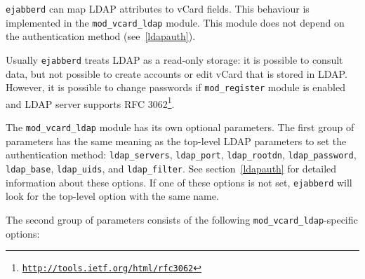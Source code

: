\documentclass[a4paper,10pt]{book}
\newcommand{\option}[1]{\texttt{#1}}
\newcommand{\ejabberd}{\texttt{ejabberd}}
\newcommand{\module}[1]{\texttt{#1}}
\newcommand{\modvcardldap}{\module{mod\_vcard\_ldap}}
\gdef\footahref#1#2{#2\footnote{\href{#1}{\texttt{#1}}}}
\begin{document}

\ejabberd{} can map LDAP attributes to vCard fields. This behaviour is
implemented in the \modvcardldap{} module. This module does not depend on the
authentication method (see~\ref{ldapauth}).

Usually \ejabberd{} treats LDAP as a read-only storage:
it is possible to consult data, but not possible to
create accounts or edit vCard that is stored in LDAP.
However, it is possible to change passwords if \module{mod\_register} module is enabled
and LDAP server supports
\footahref{http://tools.ietf.org/html/rfc3062}{RFC 3062}.

The \modvcardldap{} module has
its own optional parameters. The first group of parameters has the same
meaning as the top-level LDAP parameters to set the authentication method:
\option{ldap\_servers}, \option{ldap\_port}, \option{ldap\_rootdn},
\option{ldap\_password}, \option{ldap\_base}, \option{ldap\_uids}, and
\option{ldap\_filter}. See section~\ref{ldapauth} for detailed information
about these options. If one of these options is not set, \ejabberd{} will look
for the top-level option with the same name.

The second group of parameters
consists of the following \modvcardldap{}-specific options:
\end{document}
